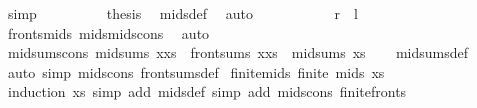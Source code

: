 \begin{isabellebody}
\ simp\isanewline
\ \ \ \ \ \ \isamarkupfalse%
\ \isamarkupfalse%
\ {\isacharquery}{\kern0pt}thesis\ \isamarkupfalse%
\ mids{\isacharunderscore}{\kern0pt}def\ \isamarkupfalse%
\ auto\isanewline
\ \ \ \ \isamarkupfalse%
\isanewline
\ \ \isamarkupfalse%
\isanewline
\ \ \isamarkupfalse%
\ {\isachardoublequoteopen}{\isacharquery}{\kern0pt}r\ {\isasymsubseteq}\ {\isacharquery}{\kern0pt}l{\isachardoublequoteclose}\ \isamarkupfalse%
\ fronts{\isacharunderscore}{\kern0pt}mids\ mids{\isacharunderscore}{\kern0pt}mids{\isacharunderscore}{\kern0pt}cons\ \isamarkupfalse%
\ auto\isanewline
{}\isamarkupfalse%
%
\endisatagproof
{\isafoldproof}%
%
\isadelimproof
\isanewline
%
\endisadelimproof
\isanewline
{}\isamarkupfalse%
\ mid{\isacharunderscore}{\kern0pt}sums{\isacharunderscore}{\kern0pt}cons{\isacharcolon}{\kern0pt}\ {\isachardoublequoteopen}mid{\isacharunderscore}{\kern0pt}sums\ {\isacharparenleft}{\kern0pt}x{\isacharhash}{\kern0pt}xs{\isacharparenright}{\kern0pt}\ {\isacharequal}{\kern0pt}\ front{\isacharunderscore}{\kern0pt}sums\ {\isacharparenleft}{\kern0pt}x{\isacharhash}{\kern0pt}xs{\isacharparenright}{\kern0pt}\ {\isasymunion}\ mid{\isacharunderscore}{\kern0pt}sums\ xs{\isachardoublequoteclose}\isanewline
%
\isadelimproof
\ \ %
\endisadelimproof
%
\isatagproof
{}\isamarkupfalse%
\ mid{\isacharunderscore}{\kern0pt}sums{\isacharunderscore}{\kern0pt}def\ \isamarkupfalse%
\ {\isacharparenleft}{\kern0pt}auto\ simp{\isacharcolon}{\kern0pt}\ mids{\isacharunderscore}{\kern0pt}cons\ front{\isacharunderscore}{\kern0pt}sums{\isacharunderscore}{\kern0pt}def{\isacharparenright}{\kern0pt}%
\endisatagproof
{\isafoldproof}%
%
\isadelimproof
\isanewline
%
\endisadelimproof
\isanewline
{}\isamarkupfalse%
\ finite{\isacharunderscore}{\kern0pt}mids{\isacharcolon}{\kern0pt}\ {\isachardoublequoteopen}finite\ {\isacharparenleft}{\kern0pt}mids\ xs{\isacharparenright}{\kern0pt}{\isachardoublequoteclose}\isanewline
%
\isadelimproof
\ \ %
\endisadelimproof
%
\isatagproof
{}\isamarkupfalse%
\ {\isacharparenleft}{\kern0pt}induction\ xs{\isacharparenright}{\kern0pt}\ {\isacharparenleft}{\kern0pt}simp\ add{\isacharcolon}{\kern0pt}\ mids{\isacharunderscore}{\kern0pt}def{\isacharcomma}{\kern0pt}\ simp\ add{\isacharcolon}{\kern0pt}\ mids{\isacharunderscore}{\kern0pt}cons\ finite{\isacharunderscore}{\kern0pt}fronts{\isacharparenright}{\kern0pt}%
\endisatagproof

\end{isabellebody}
